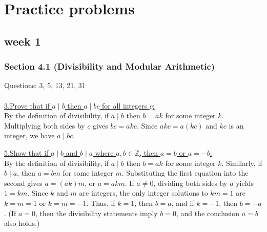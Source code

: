 \documentclass[12pt]{article}
\begin{document}
\newpage
\section{Practice problems}
\subsection*{week 1}


\subsubsection*{Section 4.1 (Divisibility and Modular Arithmetic)}

Questions: 3, 5, 13, 21, 31
\\\\
\underline{3.\;Prove that if $a \mid b$ then $a \mid bc$ for all integers $c$:}
\\\indent By the definition of divisibility, if $a \mid b$ then $b = ak$ for some integer $k$.
Multiplying both sides by $c$ gives $bc = akc$.
Since $akc = a(kc)$ and $kc$ is an integer, we have $a \mid bc$.   

\vspace{5mm}
\underline{5.\;Show that if $a \mid b$ and $b\mid a$ where $a,b \in \mathbb{Z}$, then $a=b$ or $a=-b$:}
\\\indent By the definition of divisibility, if $a \mid b$ then $b = ak$ for some integer $k$.
Similarly, if $b \mid a$, then $a = bm$ for some integer $m$.
Substituting the first equation into the second gives $a = (ak)m$, or $a = akm$.
If $a\neq 0$, dividing both sides by $a$ yields $1 = km$.
Since $k$ and $m$ are integers, the only integer solutions to $km=1$ are $k=m=1$ or $k=m=-1$.
Thus, if $k=1$, then $b=a$, and if $k=-1$, then $b=-a$.
(If $a=0$, then the divisibility statements imply $b=0$, and the conclusion $a=b$ also holds.)
\end{document}
